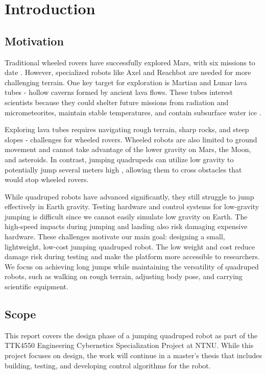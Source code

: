 \section{Introduction}
\label{sec:introduction}

\subsection{Motivation}
\label{sec:motivation}

Traditional wheeled rovers have successfully explored Mars, with six missions to date \cite{mars_rovers_x6}. However, specialized robots like Axel \cite{Axel} and Reachbot \cite{ReachBot} are needed for more challenging terrain. One key target for exploration is Martian and Lunar lava tubes \cite{lavatubes} - hollow caverns formed by ancient lava flows. These tubes interest scientists because they could shelter future missions from radiation and micrometeorites, maintain stable temperatures, and contain subsurface water ice \cite{lavatubes}.

Exploring lava tubes requires navigating rough terrain, sharp rocks, and steep slopes - challenges for wheeled rovers. Wheeled robots are also limited to ground movement and cannot take advantage of the lower gravity on Mars, the Moon, and asteroids. In contrast, jumping quadrupeds can utilize low gravity to potentially jump several meters high \cite{OLYMPUS2}, allowing them to cross obstacles that would stop wheeled rovers.

While quadruped robots have advanced significantly, they still struggle to jump effectively in Earth gravity. Testing hardware and control systems for low-gravity jumping is difficult since we cannot easily simulate low gravity on Earth. The high-speed impacts during jumping and landing also risk damaging expensive hardware. These challenges motivate our main goal: designing a small, lightweight, low-cost jumping quadruped robot. The low weight and cost reduce damage risk during testing and make the platform more accessible to researchers. We focus on achieving long jumps while maintaining the versatility of quadruped robots, such as walking on rough terrain, adjusting body pose, and carrying scientific equipment.

\subsection{Scope}
\label{sec:scope}

This report covers the design phase of a jumping quadruped robot as part of the TTK4550 Engineering Cybernetics Specialization Project at NTNU. While this project focuses on design, the work will continue in a master's thesis that includes building, testing, and developing control algorithms for the robot.

